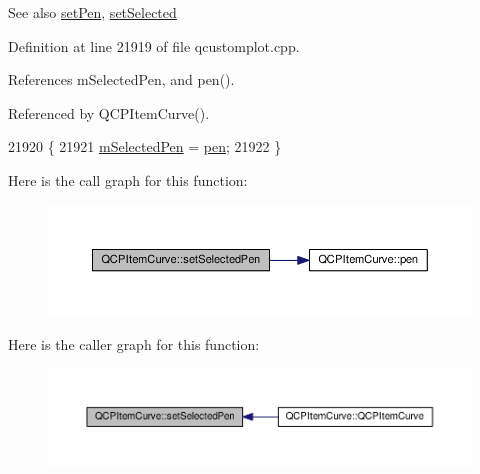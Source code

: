 \begin{DoxySeeAlso}{See also}
\hyperlink{class_q_c_p_item_curve_a034be908440aec785c34b92843461221}{set\+Pen}, \hyperlink{class_q_c_p_abstract_item_a203de94ad586cc44d16c9565f49d3378}{set\+Selected} 
\end{DoxySeeAlso}


Definition at line 21919 of file qcustomplot.\+cpp.



References m\+Selected\+Pen, and pen().



Referenced by Q\+C\+P\+Item\+Curve().


\begin{DoxyCode}
21920 \{
21921   \hyperlink{class_q_c_p_item_curve_ab22cbab261b20be5aa8e4ca252149246}{mSelectedPen} = \hyperlink{class_q_c_p_item_curve_abc6321e55a9ba1a0c7df407843dfa252}{pen};
21922 \}
\end{DoxyCode}


Here is the call graph for this function\+:\nopagebreak
\begin{figure}[H]
\begin{center}
\leavevmode
\includegraphics[width=350pt]{class_q_c_p_item_curve_a375b917669f868c5a106bf2f1ab7c26d_cgraph}
\end{center}
\end{figure}




Here is the caller graph for this function\+:\nopagebreak
\begin{figure}[H]
\begin{center}
\leavevmode
\includegraphics[width=350pt]{class_q_c_p_item_curve_a375b917669f868c5a106bf2f1ab7c26d_icgraph}
\end{center}
\end{figure}


\hypertarget{class_q_c_p_item_curve_ac3488d8b1a6489c845dc5bff3ef71124}{}
